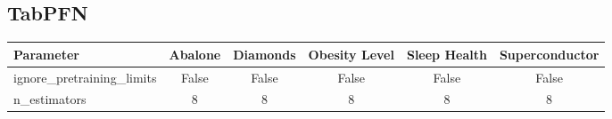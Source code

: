 \subsection{TabPFN}
\label{tab:tabpfn-config}

\begin{center}
  \small
  \setlength{\tabcolsep}{5pt}
  \vspace{0.8em}
  \begin{tabular}{lccccc}
    \toprule
    \textbf{Parameter} & \textbf{Abalone} & \textbf{Diamonds} & \textbf{Obesity Level} & \textbf{Sleep Health} & \textbf{Superconductor} \\
    \midrule
    ignore\_pretraining\_limits & False & False & False & False & False \\
    n\_estimators    & 8    & 8    & 8    & 8    & 8 \\
    \bottomrule
  \end{tabular}

  \label{tab:tabpfn-config}
\end{center}